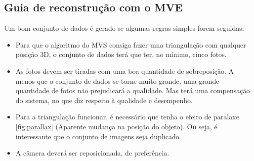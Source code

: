 \subsection{Guia de reconstrução com o MVE~\cite{pipelinemve}}

Um bom conjunto de dados é gerado se algumas regras simples forem seguidas:

\begin{itemize}

\item{Para que o algoritmo do MVS consiga fazer uma triangulação com qualquer posição 3D, o conjunto de dados terá que ter, no mínimo, cinco fotos.}

\item{As fotos devem ser tiradas com uma boa quantidade de sobreposição. A menos que o conjunto de dados se torne muito grande, uma grande quantidade de fotos não prejudicará a qualidade. 
Mas terá uma compensação do sistema, no que diz respeito à qualidade e desempenho.}

\item{Para a triangulação funcionar, é necessário que tenha o efeito de paralaxe \ref{fig:parallax} (Aparente mudança na posição do objeto). Ou seja, é interessante que o conjunto de imagens seja duplicado.}

\item{A câmera deverá ser reposicionada, de preferência.}

\end{itemize}

